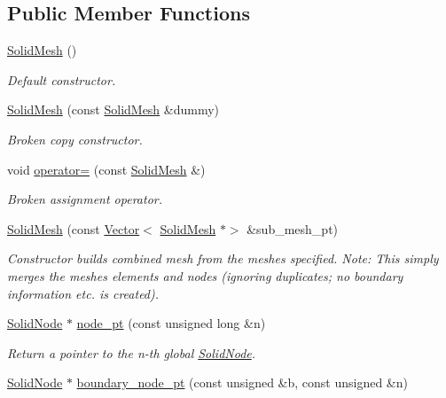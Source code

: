 \subsection*{Public Member Functions}
\begin{DoxyCompactItemize}
\item 
\hyperlink{classoomph_1_1SolidMesh_a3b6da67f7de6bc1a617865729cbf8ad0}{Solid\+Mesh} ()
\begin{DoxyCompactList}\small\item\em Default constructor. \end{DoxyCompactList}\item 
\hyperlink{classoomph_1_1SolidMesh_a2db1ac9609ffd7d211e662d5edb2ebc9}{Solid\+Mesh} (const \hyperlink{classoomph_1_1SolidMesh}{Solid\+Mesh} \&dummy)
\begin{DoxyCompactList}\small\item\em Broken copy constructor. \end{DoxyCompactList}\item 
void \hyperlink{classoomph_1_1SolidMesh_ab1c6f1a9990c124c686193398a8364bb}{operator=} (const \hyperlink{classoomph_1_1SolidMesh}{Solid\+Mesh} \&)
\begin{DoxyCompactList}\small\item\em Broken assignment operator. \end{DoxyCompactList}\item 
\hyperlink{classoomph_1_1SolidMesh_a3768a52eff24c803291af72c51cddf93}{Solid\+Mesh} (const \hyperlink{classoomph_1_1Vector}{Vector}$<$ \hyperlink{classoomph_1_1SolidMesh}{Solid\+Mesh} $\ast$$>$ \&sub\+\_\+mesh\+\_\+pt)
\begin{DoxyCompactList}\small\item\em Constructor builds combined mesh from the meshes specified. Note\+: This simply merges the meshes\textquotesingle{} elements and nodes (ignoring duplicates; no boundary information etc. is created). \end{DoxyCompactList}\item 
\hyperlink{classoomph_1_1SolidNode}{Solid\+Node} $\ast$ \hyperlink{classoomph_1_1SolidMesh_a8b096888d09593a6cdec9ede72eb5850}{node\+\_\+pt} (const unsigned long \&n)
\begin{DoxyCompactList}\small\item\em Return a pointer to the n-\/th global \hyperlink{classoomph_1_1SolidNode}{Solid\+Node}. \end{DoxyCompactList}\item 
\hyperlink{classoomph_1_1SolidNode}{Solid\+Node} $\ast$ \hyperlink{classoomph_1_1SolidMesh_af2d057e3b0af894bb548bcc73765c414}{boundary\+\_\+node\+\_\+pt} (const unsigned \&b, const unsigned \&n)
$$
\end{DoxyCompactItemize}
